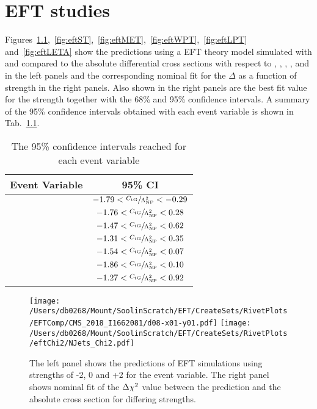 \chapter{EFT studies}
\label{ch:eft}
Figures~\ref{fig:eftNJET},~\ref{fig:eftST},~\ref{fig:eftMET},~\ref{fig:eftWPT},~\ref{fig:eftLPT} and~\ref{fig:eftLETA} show the predictions using a \LO{} EFT theory model simulated with \mgamcLO{} and \pythia{} compared to the absolute differential \ttbar{} cross sections with respect to \NJET{}, \ST{}, \ptmiss{}, \WPT{}, \LPT{} and \LETA{} in the left panels and the corresponding nominal fit for the $\Delta$ \chisq{} as a function of \CTG{} strength in the right panels.
Also shown in the right panels are the best fit value for the \CTG{} strength together with the 68\% and 95\% confidence intervals.
A summary of the 95\% confidence intervals obtained with each event variable is shown in Tab.~\ref{tb:eft}.
\begin{table}[h!]
	\centering
	\caption{The 95\% confidence intervals reached for each event variable}
	\label{tb:eft}
	\begin{tabular}{cc}
		\textbf{Event Variable}		& \textbf{95\% CI} \rule{0pt}{1.0em}\\	
		\hline
		\rule{0pt}{1.0em}\NJET{}	&	$ -1.79 < \sfrac{C_{\mathrm{tG}}}{\Lambda_{\mathrm{NP}}^{2}} < -0.29 $ \\
		\HT{}						&	$ -1.76 < \sfrac{C_{\mathrm{tG}}}{\Lambda_{\mathrm{NP}}^{2}} < 0.28 $ \\
		\ST{}						&	$ -1.47 < \sfrac{C_{\mathrm{tG}}}{\Lambda_{\mathrm{NP}}^{2}} < 0.62 $ \\
		\ptmiss{}					&	$ -1.31 < \sfrac{C_{\mathrm{tG}}}{\Lambda_{\mathrm{NP}}^{2}} < 0.35 $ \\
		\WPT{}						&	$ -1.54 < \sfrac{C_{\mathrm{tG}}}{\Lambda_{\mathrm{NP}}^{2}} < 0.07 $ \\
		\LPT{}						&	$ -1.86 < \sfrac{C_{\mathrm{tG}}}{\Lambda_{\mathrm{NP}}^{2}} < 0.10 $ \\
		\LETA{} 					&	$ -1.27 < \sfrac{C_{\mathrm{tG}}}{\Lambda_{\mathrm{NP}}^{2}} < 0.92 $ \\
	\end{tabular}%
\end{table}

\begin{figure}[htpb]
	\centering
	\texttt{[image: /Users/db0268/Mount/SoolinScratch/EFT/CreateSets/RivetPlots/EFTComp/CMS\_2018\_I1662081/d08-x01-y01.pdf]}
	\texttt{[image: /Users/db0268/Mount/SoolinScratch/EFT/CreateSets/RivetPlots/eftChi2/NJets\_Chi2.pdf]}
	\caption[The left panel shows the predictions of EFT simulations using \CTG{} strengths of -2, 0 and +2 for the \NJET{} event variable. The right panel shows nominal fit of the $\Delta \chisq{}$ value between the prediction and the absolute \ttbar{} cross section for differing \CTG{} strengths.]{The left panel shows the predictions of EFT simulations using \CTG{} strengths of -2, 0 and +2 for the \NJET{} event variable. The right panel shows nominal fit of the $\Delta \chisq{}$ value between the prediction and the absolute \ttbar{} cross section for differing \CTG{} strengths.}
	\label{fig:eftNJET}
\end{figure}

